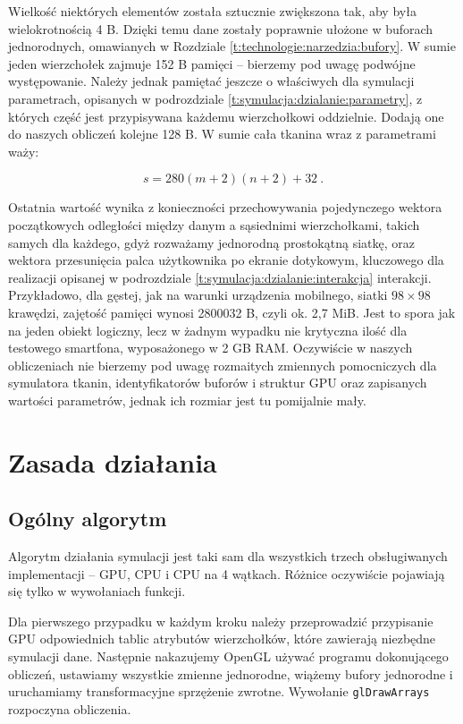 	Wielkość niektórych elementów została sztucznie zwiększona tak, aby była wielokrotnością 4 B. Dzięki temu dane zostały poprawnie ułożone w buforach jednorodnych, omawianych w Rozdziale \ref{t:technologie:narzedzia:bufory}. W sumie jeden wierzchołek zajmuje 152 B pamięci -- bierzemy pod uwagę podwójne występowanie. Należy jednak pamiętać jeszcze o właściwych dla symulacji parametrach, opisanych w podrozdziale \ref{t:symulacja:dzialanie:parametry}, z których część jest przypisywana każdemu wierzchołkowi oddzielnie. Dodają one do naszych obliczeń kolejne 128 B. W sumie cała tkanina wraz z parametrami waży:
	
	\begin{equation}
	s = 280(m + 2)(n + 2) + 32 \ .
	\end{equation} 
	
	Ostatnia wartość wynika z konieczności przechowywania pojedynczego wektora początkowych odległości między danym a sąsiednimi wierzchołkami, takich samych dla każdego, gdyż rozważamy jednorodną prostokątną siatkę, oraz wektora przesunięcia palca użytkownika po ekranie dotykowym, kluczowego dla realizacji opisanej w podrozdziale \ref{t:symulacja:dzialanie:interakcja} interakcji. Przykładowo, dla gęstej, jak na warunki urządzenia mobilnego, siatki \( 98 \times 98 \) krawędzi, zajętość pamięci wynosi 2800032 B, czyli ok. 2,7 MiB. Jest to spora jak na jeden obiekt logiczny, lecz w żadnym wypadku nie krytyczna ilość dla testowego smartfona, wyposażonego w 2 GB RAM. Oczywiście w naszych obliczeniach nie bierzemy pod uwagę rozmaitych zmiennych pomocniczych dla symulatora tkanin, identyfikatorów buforów i struktur GPU oraz zapisanych wartości parametrów, jednak ich rozmiar jest tu pomijalnie mały.
	
	\section{Zasada działania}
	\label{t:symulacja:dzialanie}
	
		\subsection{Ogólny algorytm}
		\label{t:symulacja:dzialanie:algorytm}
		
		Algorytm działania symulacji jest taki sam dla wszystkich trzech obsługiwanych implementacji -- GPU, CPU i CPU na 4 wątkach. Różnice oczywiście pojawiają się tylko w wywołaniach funkcji. 
		
		Dla pierwszego przypadku w każdym kroku należy przeprowadzić przypisanie GPU odpowiednich tablic atrybutów wierzchołków, które zawierają niezbędne symulacji dane. Następnie nakazujemy OpenGL używać programu dokonującego obliczeń, ustawiamy wszystkie zmienne jednorodne, wiążemy bufory jednorodne i uruchamiamy transformacyjne sprzężenie zwrotne. Wywołanie \texttt{glDrawArrays} rozpoczyna obliczenia. 
		
